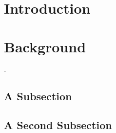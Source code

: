 \documentclass{workreport}
\begin{document}

\begin{body}

\section{Introduction}

	\lipsum[1-6]

\section{Background}

	\lipsum[1-2]-

\subsection{A Subsection}

	\lipsum[1]

\subsection{A Second Subsection}

	\lipsum[2]


\end{body}
\end{document}
